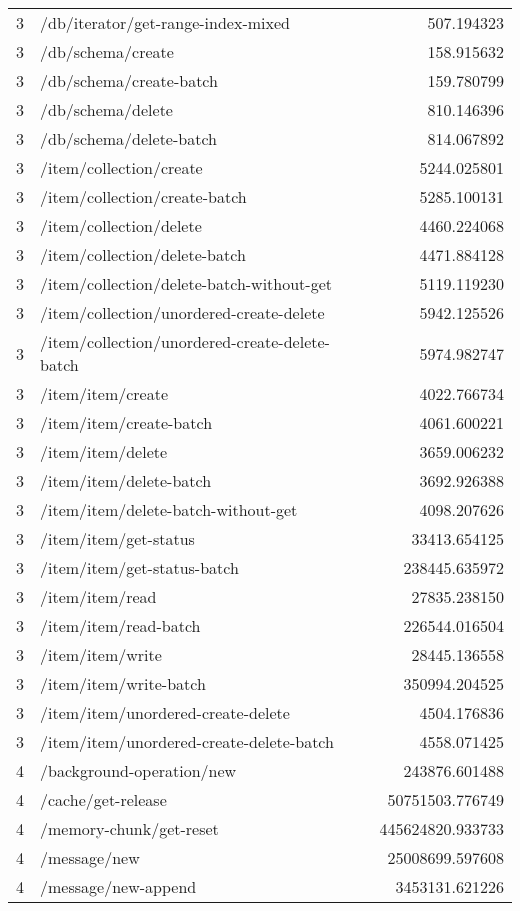 \begin{longtable}{rlr}
3 & /db/iterator/get-range-index-mixed & 507.194323 \\
3 & /db/schema/create & 158.915632 \\
3 & /db/schema/create-batch & 159.780799 \\
3 & /db/schema/delete & 810.146396 \\
3 & /db/schema/delete-batch & 814.067892 \\
3 & /item/collection/create & 5244.025801 \\
3 & /item/collection/create-batch & 5285.100131 \\
3 & /item/collection/delete & 4460.224068 \\
3 & /item/collection/delete-batch & 4471.884128 \\
3 & /item/collection/delete-batch-without-get & 5119.119230 \\
3 & /item/collection/unordered-create-delete & 5942.125526 \\
3 & /item/collection/unordered-create-delete-batch & 5974.982747 \\
3 & /item/item/create & 4022.766734 \\
3 & /item/item/create-batch & 4061.600221 \\
3 & /item/item/delete & 3659.006232 \\
3 & /item/item/delete-batch & 3692.926388 \\
3 & /item/item/delete-batch-without-get & 4098.207626 \\
3 & /item/item/get-status & 33413.654125 \\
3 & /item/item/get-status-batch & 238445.635972 \\
3 & /item/item/read & 27835.238150 \\
3 & /item/item/read-batch & 226544.016504 \\
3 & /item/item/write & 28445.136558 \\
3 & /item/item/write-batch & 350994.204525 \\
3 & /item/item/unordered-create-delete & 4504.176836 \\
3 & /item/item/unordered-create-delete-batch & 4558.071425 \\
4 & /background-operation/new & 243876.601488 \\
4 & /cache/get-release & 50751503.776749 \\
4 & /memory-chunk/get-reset & 445624820.933733 \\
4 & /message/new & 25008699.597608 \\
4 & /message/new-append & 3453131.621226 \\

\end{longtable}
